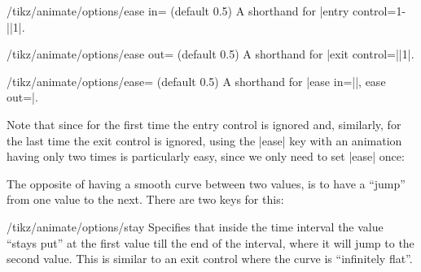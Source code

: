 \begin{key}{/tikz/animate/options/ease in= (default 0.5)}
    A shorthand for |entry control={1-||}{1}|.
\end{key}

\begin{key}{/tikz/animate/options/ease out= (default 0.5)}
    A shorthand for |exit control={||}{1}|.
\end{key}

\begin{key}{/tikz/animate/options/ease= (default 0.5)}
    A shorthand for |ease in=||, ease out=|.

    Note that since for the first time the entry control is ignored and,
    similarly, for the last time the exit control is ignored, using the |ease|
    key with an animation having only two times is particularly easy, since we
    only need to set |ease| once:
\begin{codeexample}[imagesource={standalone/pgfmanual-en-tikz-animations-animation-79.svg}]
\end{codeexample}
\end{key}

The opposite of having a smooth curve between two values, is to have a ``jump''
from one value to the next. There are two keys for this:

\begin{key}{/tikz/animate/options/stay}
    Specifies that inside the time interval the value ``stays put'' at the
    first value till the end of the interval, where it will jump to the second
    value. This is similar to an exit control where the curve is ``infinitely
    flat''.
\begin{codeexample}[imagesource={standalone/pgfmanual-en-tikz-animations-animation-80.svg}]
\end{codeexample}
\end{key}

